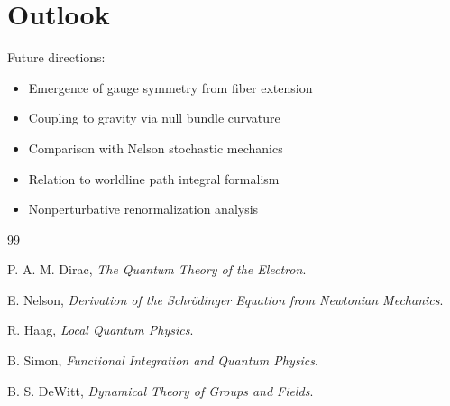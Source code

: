 \documentclass[11pt]{article}
\theoremstyle{definition}
\begin{document}
\section{Outlook}

Future directions:

\begin{itemize}
\item Emergence of gauge symmetry from fiber extension
\item Coupling to gravity via null bundle curvature
\item Comparison with Nelson stochastic mechanics
\item Relation to worldline path integral formalism
\item Nonperturbative renormalization analysis
\end{itemize}

\begin{thebibliography}{99}

P. A. M. Dirac,
\textit{The Quantum Theory of the Electron}.

E. Nelson,
\textit{Derivation of the Schrödinger Equation from Newtonian Mechanics}.

R. Haag,
\textit{Local Quantum Physics}.

B. Simon,
\textit{Functional Integration and Quantum Physics}.

B. S. DeWitt,
\textit{Dynamical Theory of Groups and Fields}.

\end{thebibliography}
\end{document}
